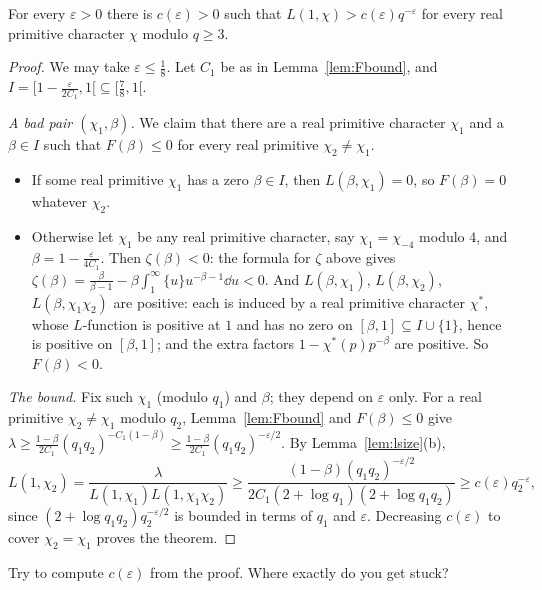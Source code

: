 \begin{theorem}[Siegel, 1935]\label{thm:siegel}
For every $\varepsilon>0$ there is $c(\varepsilon)>0$ such that $L(1,\chi)>c(\varepsilon)q^{-\varepsilon}$ for every real primitive character $\chi$ modulo $q\ge3$.
\end{theorem}
\begin{proof}
We may take $\varepsilon\le\frac18$. Let $C_1$ be as in Lemma~\ref{lem:Fbound}, and $I=\bigl[1-\frac\varepsilon{2C_1},1\bigr[\subseteq\bigl[\frac78,1\bigr[$.

\emph{A bad pair $(\chi_1,\beta)$.} We claim that there are a real primitive character $\chi_1$ and a $\beta\in I$ such that $F(\beta)\le0$ for every real primitive $\chi_2\ne\chi_1$.
\begin{itemize}
\item If some real primitive $\chi_1$ has a zero $\beta\in I$, then $L(\beta,\chi_1)=0$, so $F(\beta)=0$ whatever $\chi_2$.
\item Otherwise let $\chi_1$ be any real primitive character, say $\chi_1=\chi_{-4}$ modulo $4$, and $\beta=1-\frac\varepsilon{4C_1}$. Then $\zeta(\beta)<0$: the formula for $\zeta$ above gives $\zeta(\beta)=\frac\beta{\beta-1}-\beta\int_1^\infty\{u\}u^{-\beta-1}\dd u<0$. And $L(\beta,\chi_1)$, $L(\beta,\chi_2)$, $L(\beta,\chi_1\chi_2)$ are positive: each is induced by a real primitive
character $\chi^*$, whose $L$-function is positive at $1$ and has no zero on $[\beta,1]\subseteq I\cup\{1\}$, hence is positive on $[\beta,1]$; and the extra factors $1-\chi^*(p)p^{-\beta}$ are positive. So $F(\beta)<0$.
\end{itemize}

\emph{The bound.} Fix such $\chi_1$ (modulo $q_1$) and $\beta$; they depend on $\varepsilon$ only. For a real primitive $\chi_2\ne\chi_1$ modulo $q_2$, Lemma~\ref{lem:Fbound} and $F(\beta)\le0$ give $\lambda\ge\frac{1-\beta}{2C_1}(q_1q_2)^{-C_1(1-\beta)}\ge\frac{1-\beta}{2C_1}(q_1q_2)^{-\varepsilon/2}$. By Lemma~\ref{lem:lsize}(b),
\[
L(1,\chi_2)=\frac\lambda{L(1,\chi_1)L(1,\chi_1\chi_2)}\ge\frac{(1-\beta)(q_1q_2)^{-\varepsilon/2}}{2C_1(2+\log q_1)(2+\log q_1q_2)}\ge c(\varepsilon)q_2^{-\varepsilon},
\]
since $(2+\log q_1q_2)q_2^{-\varepsilon/2}$ is bounded in terms of $q_1$ and $\varepsilon$. Decreasing $c(\varepsilon)$ to cover $\chi_2=\chi_1$ proves the theorem.
\end{proof}

\begin{think}
Try to compute $c(\varepsilon)$ from the proof. Where exactly do you get stuck?
\end{think}

